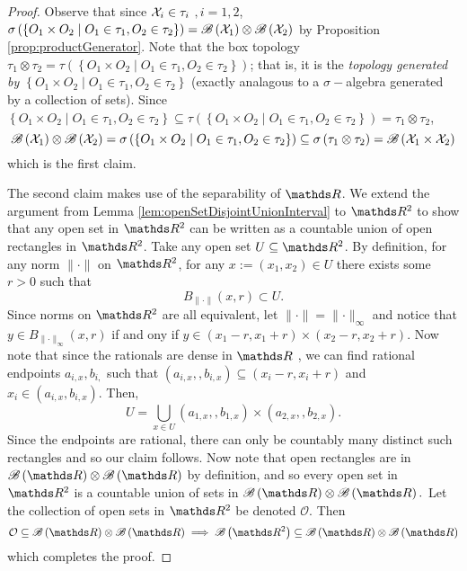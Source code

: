 \begin{proof}
Observe that since $\mathcal{X}_{i}\in\tau_{i}$ $,i=1,2$, $\sigma\left(\left\{ O_{1}\times O_{2}\mid O_{1}\in\tau_{1},O_{2}\in\tau_{2}\right\} \right)=\mathscr{B}\left(\mathcal{X}_{1}\right)\otimes\mathscr{B}\left(\mathcal{X}_{2}\right)$
by Proposition \ref{prop:productGenerator}. Note that the box topology
$\tau_{1}\otimes\tau_{2}=\tau\left(\left\{ O_{1}\times O_{2}\mid O_{1}\in\tau_{1},O_{2}\in\tau_{2}\right\} \right)$;
that is, it is the \emph{topology generated by $\left\{ O_{1}\times O_{2}\mid O_{1}\in\tau_{1},O_{2}\in\tau_{2}\right\} $
}(exactly analagous to a $\sigma-$algebra generated by a collection
of sets). Since $\left\{ O_{1}\times O_{2}\mid O_{1}\in\tau_{1},O_{2}\in\tau_{2}\right\} \subseteq\tau\left(\left\{ O_{1}\times O_{2}\mid O_{1}\in\tau_{1},O_{2}\in\tau_{2}\right\} \right)=\tau_{1}\otimes\tau_{2}$,
\[
\mathscr{B}\left(\mathcal{X}_{1}\right)\otimes\mathscr{B}\left(\mathcal{X}_{2}\right)=\sigma\left(\left\{ O_{1}\times O_{2}\mid O_{1}\in\tau_{1},O_{2}\in\tau_{2}\right\} \right)\subseteq\sigma\left(\tau_{1}\otimes\tau_{2}\right)=\mathscr{B}\left(\mathcal{X}_{1}\times\mathcal{X}_{2}\right)
\]
which is the first claim.

The second claim makes use of the separability of $\R$. We extend
the argument from Lemma \ref{lem:openSetDisjointUnionInterval} to
$\R^{2}$ to show that any open set in $\R^{2}$ can be written as
a countable union of open rectangles in $\R^{2}$. Take any open set
$U\subseteq\R^{2}$. By definition, for any norm $\lVert\cdot\rVert$
on $\R^{2}$, for any $x:=\left(x_{1},x_{2}\right)\in U$ there exists
some $r>0$ such that 
\[
B_{\lVert\cdot\rVert}\left(x,r\right)\subset U.
\]
Since norms on $\R^{2}$ are all equivalent, let $\lVert\cdot\rVert=\lVert\cdot\rVert_{\infty}$
and notice that $y\in B_{\lVert\cdot\rVert_{\infty}}\left(x,r\right)$
if and ony if $y\in\left(x_{1}-r,x_{1}+r\right)\times\left(x_{2}-r,x_{2}+r\right)$.
Now note that since the rationals are dense in $\R$ , we can find
rational endpoints $a_{i,x},b_{i,}$ such that $\left(a_{i,x},,b_{i,x}\right)\subseteq\left(x_{i}-r,x_{i}+r\right)$
and $x_{i}\in\left(a_{i,x},b_{i,x}\right).$ Then, 
\[
U=\bigcup_{x\in U}\left(a_{1,x},,b_{1,x}\right)\times\left(a_{2,x},,b_{2,x}\right).
\]
Since the endpoints are rational, there can only be countably many
distinct such rectangles and so our claim follows. Now note that open
rectangles are in $\borel\left(\R\right)\otimes\borel\left(\R\right)$
by definition, and so every open set in $\R^{2}$ is a countable union
of sets in $\borel\left(\R\right)\otimes\borel\left(\R\right).$ Let
the collection of open sets in $\R^{2}$ be denoted $\mathcal{O}$.
Then
\[
\mathcal{O}\subseteq\borel\left(\R\right)\otimes\borel\left(\R\right)\implies\borel\left(\R^{2}\right)\subseteq\borel\left(\R\right)\otimes\borel\left(\R\right)
\]
which completes the proof.
\end{proof}
